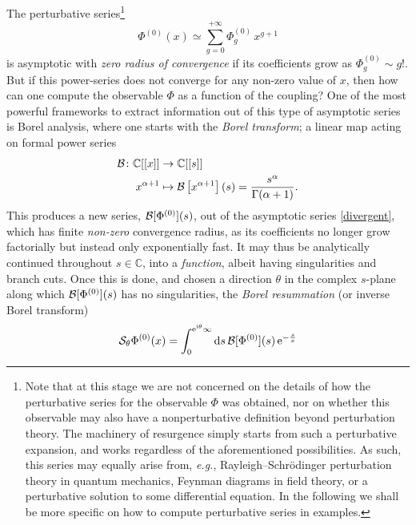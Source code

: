 \documentclass[11pt,a4paper]{article}
\newcommand{\CB}{{\cal B}}
\newcommand{\CS}{{\cal S}}
\def\BC{{\mathbb C}}
\newcommand{\be}{\begin{equation}}
\newcommand{\ee}{\end{equation}}
\newcommand{\rme}{{\mathrm{e}}}
\newcommand{\rmi}{{\mathrm{i}}}
\newcommand{\rmd}{{\mathrm{d}}}
\begin{document}
The perturbative series\footnote{Note that at this stage we are not concerned on the details of how the perturbative series for the observable $\Phi$ was obtained, nor on whether this observable may also have a nonperturbative definition beyond perturbation theory. The machinery of resurgence simply starts from such a perturbative expansion, and works regardless of the aforementioned possibilities. As such, this series may equally arise from, \textit{e.g.}, Rayleigh--Schr\"odinger perturbation theory in quantum mechanics, Feynman diagrams in field theory, or a perturbative solution to some differential equation. In the following we shall be more specific on how to compute perturbative series in examples.}
%
\be
\label{divergent}
\Phi^{(0)} (x) \simeq \sum_{g=0}^{+\infty} \Phi^{(0)}_g\, x^{g+1}
\ee
%
\noindent
is asymptotic with \textit{zero radius of convergence} if its coefficients grow as $\Phi^{(0)}_g \sim g!$. But if this power-series does not converge for any non-zero value of $x$, then how can one compute the observable $\Phi$ as a function of the coupling? One of the most powerful frameworks to extract information out of this type of asymptotic series is Borel analysis, where one starts with the \textit{Borel transform}; a linear map acting on formal power series
%
\begin{align}
\CB \colon \BC [[x]] &\rightarrow \BC [[s]] \\
x^{\alpha+1} &\mapsto \CB \left[ x^{\alpha+1} \right](s) = \frac{s^{\alpha}}{\Gamma(\alpha+1)}.
\label{boreltrans}
\end{align}
%
\noindent
This produces a new series, $\CB [\Phi^{(0)}] (s)$, out of the asymptotic series \eqref{divergent}, which has finite \textit{non-zero} convergence radius, as its coefficients no longer grow factorially but instead only exponentially fast. It may thus be analytically continued throughout $s \in \BC$, into a \textit{function}, albeit having singularities and branch cuts. Once this is done, and chosen a direction $\theta$ in the complex $s$-plane along which $\CB [\Phi^{(0)}] (s)$ has no singularities, the \textit{Borel resummation} (or inverse Borel transform)
%
\be
\label{borelresum}
\CS_\theta \Phi^{(0)} (x) = \int_0^{\rme^{\rmi\theta}\infty} \rmd s\, \CB[\Phi^{(0)}](s)\, \rme^{-\frac{s}{x}}
\ee
%
\noindent
\end{document}
